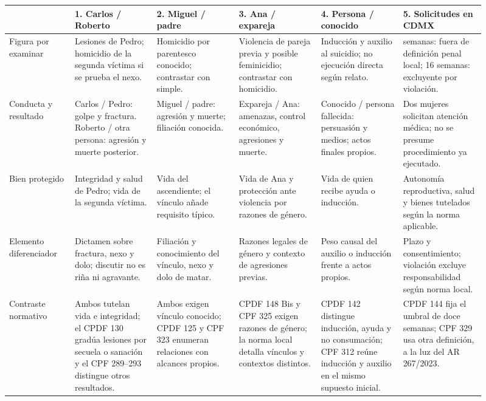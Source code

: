 \documentclass[spanish,letterpaper,oneside]{article}
\renewcommand{\arraystretch}{1.13}
\begin{document}
\begin{landscape}
\thispagestyle{empty}
\begingroup\scriptsize
\setlength{\tabcolsep}{4pt}
\renewcommand{\arraystretch}{1.62}
\begin{longtable}{@{}>{\raggedright\arraybackslash}p{0.12\linewidth}*{5}{>{\raggedright\arraybackslash}p{0.158\linewidth}}@{}}
\toprule
 & \textbf{1. Carlos / Roberto} & \textbf{2. Miguel / padre} & \textbf{3. Ana / expareja} & \textbf{4. Persona / conocido} & \textbf{5. Solicitudes en CDMX} \\
\midrule\endhead
Figura por examinar & Lesiones de Pedro; homicidio de la segunda víctima si se prueba el nexo. & Homicidio por parentesco conocido; contrastar con simple. & Violencia de pareja previa y posible feminicidio; contrastar con homicidio. & Inducción y auxilio al suicidio; no ejecución directa según relato. & 10 semanas: fuera de definición penal local; 16 semanas: excluyente por violación. \\
Conducta y resultado & Carlos / Pedro: golpe y fractura. Roberto / otra persona: agresión y muerte posterior. & Miguel / padre: agresión y muerte; filiación conocida. & Expareja / Ana: amenazas, control económico, agresiones y muerte. & Conocido / persona fallecida: persuasión y medios; actos finales propios. & Dos mujeres solicitan atención médica; no se presume procedimiento ya ejecutado. \\
Bien protegido & Integridad y salud de Pedro; vida de la segunda víctima. & Vida del ascendiente; el vínculo añade requisito típico. & Vida de Ana y protección ante violencia por razones de género. & Vida de quien recibe ayuda o inducción. & Autonomía reproductiva, salud y bienes tutelados según la norma aplicable. \\
Elemento diferenciador & Dictamen sobre fractura, nexo y dolo; discutir no es riña ni agravante. & Filiación y conocimiento del vínculo, nexo y dolo de matar. & Razones legales de género y contexto de agresiones previas. & Peso causal del auxilio o inducción frente a actos propios. & Plazo y consentimiento; violación excluye responsabilidad según norma local. \\
Contraste normativo & Ambos tutelan vida e integridad; el CPDF 130 gradúa lesiones por secuela o sanación y el CPF 289--293 distingue otros resultados. & Ambos exigen vínculo conocido; CPDF 125 y CPF 323 enumeran relaciones con alcances propios. & CPDF 148 Bis y CPF 325 exigen razones de género; la norma local detalla vínculos y contextos distintos. & CPDF 142 distingue inducción, ayuda y no consumación; CPF 312 reúne inducción y auxilio en el mismo supuesto inicial. & CPDF 144 fija el umbral de doce semanas; CPF 329 usa otra definición, a la luz del AR 267/2023. \\

\end{longtable}
\end{landscape}
\end{document}

